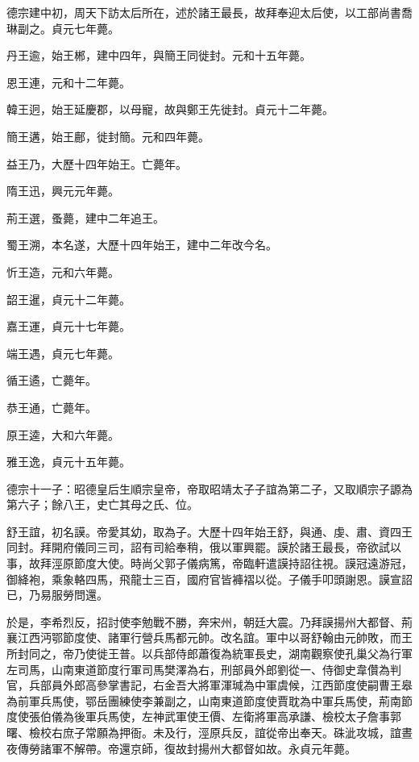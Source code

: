 \begin{pinyinscope}
 德宗建中初，周天下訪太后所在，述於諸王最長，故拜奉迎太后使，以工部尚書喬琳副之。貞元七年薨。



 丹王逾，始王郴，建中四年，與簡王同徙封。元和十五年薨。



 恩王連，元和十二年薨。



 韓王迥，始王延慶郡，以母寵，故與鄭王先徙封。貞元十二年薨。



 簡王遘，始王鄜，徙封簡。元和四年薨。



 益王乃，大歷十四年始王。亡薨年。



 隋王迅，興元元年薨。



 荊王選，蚤薨，建中二年追王。



 蜀王溯，本名遂，大歷十四年始王，建中二年改今名。



 忻王造，元和六年薨。



 韶王暹，貞元十二年薨。



 嘉王運，貞元十七年薨。



 端王遇，貞元七年薨。



 循王遹，亡薨年。



 恭王通，亡薨年。



 原王逵，大和六年薨。



 雅王逸，貞元十五年薨。



 德宗十一子：昭德皇后生順宗皇帝，帝取昭靖太子子誼為第二子，又取順宗子謜為第六子；餘八王，史亡其母之氏、位。



 舒王誼，初名謨。帝愛其幼，取為子。大歷十四年始王舒，與通、虔、肅、資四王同封。拜開府儀同三司，詔有司給奉稍，俄以軍興罷。謨於諸王最長，帝欲試以事，故拜涇原節度大使。時尚父郭子儀病篤，帝臨軒遣謨持詔往視。謨冠遠游冠，御絳袍，乘象輅四馬，飛龍士三百，國府官皆褲褶以從。子儀手叩頭謝恩。謨宣詔已，乃易服勞問還。



 於是，李希烈反，招討使李勉戰不勝，奔宋州，朝廷大震。乃拜謨揚州大都督、荊襄江西沔鄂節度使、諸軍行營兵馬都元帥。改名誼。軍中以哥舒翰由元帥敗，而王所封同之，帝乃使徙王普。以兵部侍郎蕭復為統軍長史，湖南觀察使孔巢父為行軍左司馬，山南東道節度行軍司馬樊澤為右，刑部員外郎劉從一、侍御史韋儹為判官，兵部員外郎高參掌書記，右金吾大將軍渾瑊為中軍虞候，江西節度使嗣曹王皋為前軍兵馬使，鄂岳團練使李兼副之，山南東道節度使賈耽為中軍兵馬使，荊南節度使張伯儀為後軍兵馬使，左神武軍使王價、左衛將軍高承謙、檢校太子詹事郭曙、檢校右庶子常願為押衙。未及行，涇原兵反，誼從帝出奉天。硃泚攻城，誼晝夜傳勞諸軍不解帶。帝還京師，復故封揚州大都督如故。永貞元年薨。




\end{pinyinscope}

